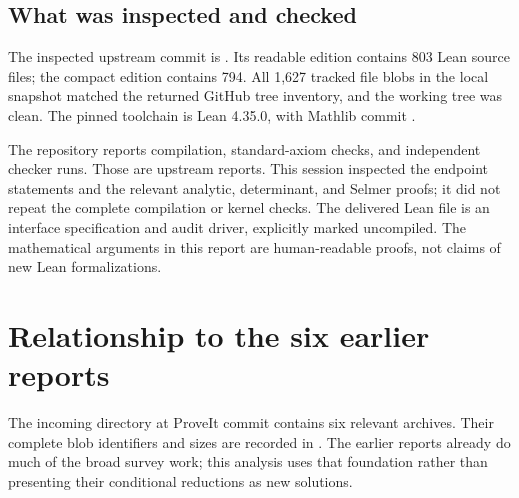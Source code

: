 \documentclass[11pt,letterpaper]{article}
\theoremstyle{definition}
\theoremstyle{remark}
\begin{document}
\subsection{What was inspected and checked}

The inspected upstream commit is
. Its readable edition
contains 803 Lean source files; the compact edition contains 794.
All 1,627 tracked file blobs in the local snapshot matched the returned
GitHub tree inventory, and the working tree was clean. The pinned
toolchain is Lean 4.35.0, with Mathlib commit
.

The repository reports compilation, standard-axiom checks, and independent
checker runs. Those are upstream reports. This session inspected the
endpoint statements and the relevant analytic, determinant, and Selmer
proofs; it did not repeat the complete compilation or kernel checks.
The delivered Lean file is an interface specification and audit driver,
explicitly marked uncompiled. The mathematical arguments in this report
are human-readable proofs, not claims of new Lean formalizations.
\cite{grh-readme}

\section{Relationship to the six earlier reports}

The incoming directory at ProveIt commit
 contains six relevant
archives. Their complete blob identifiers and sizes are recorded in
. The earlier reports already do much of
the broad survey work; this analysis uses that foundation rather than
presenting their conditional reductions as new solutions.
\end{document}
